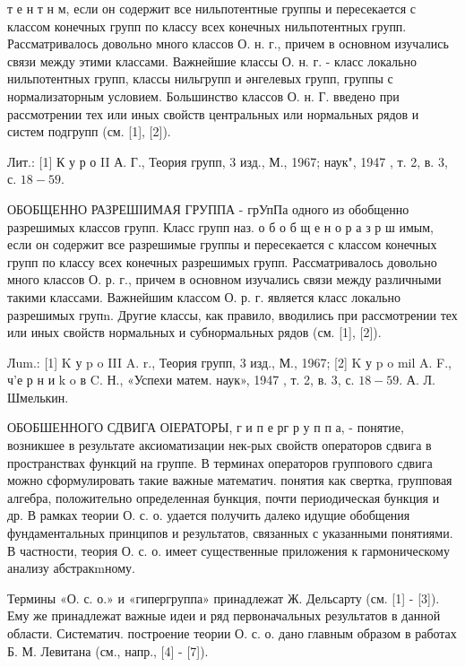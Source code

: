 \documentclass[10pt]{article}
\begin{document}
т е н т н м, если он содержит все нильпотентные группы и пересекается с классом конечных групп по классу всех конечных нильпотентных групп. Рассматривалось довольно много классов О. н. г., причем в основном изучались связи между этими классами. Важнейшие классы О. н. г. - класс локально нильпотентных групп, классы нильгрупп и әнгелевых групп, группы с нормализаторным условием. Большинство классов О. н. Г. введено при рассмотрении тех или иных свойств центральных или нормальных рядов и систем подгрупп (см. [1], [2]).



Лит.: [1] К у р о II А. Г., Теория групп, 3 изд., М., 1967; наук", 1947 , т. 2, в. 3, с. $18-59$.



ОБОБЩЕННО РАЗРЕШІИМАЯ ГРУППА - грУпПа одного из обобщенно разрешимых классов групп. Класс групп наз. о б о б щ е н о р а з р ш имым, если он содержит все разрешимые группы и пересекается с классом конечных групп по классу всех конечных разрешимых групп. Рассматривалось довольно много классов О. р. г., причем в основном изучались связи между различными такими классами. Важнейшим классом О. р. г. является класс локально разрешимых групn. Другие классы, как правило, вводились при рассмотрении тех или иных свойств нормальных и субнормальных рядов (см. [1], [2]).



Лum.: [1] K у p o III A. r., Теория групп, 3 изд., М., 1967; [2] K у p o mil A. F., ч'е р н и k o в C. Н., «Успехи матем. наук», 1947 , т. 2, в. 3, с. $18-59$. А. Л. Шмелькин.



ОБОБШЕННОГО СДВИГА ОІЕРАТОРЫ, $г$ и п е рг р у п п а, - понятие, возникшее в результате аксиоматизации нек-рых свойств операторов сдвига в пространствах функций на группе. В терминах операторов группового сдвига можно сформулировать такие важные математич. понятия как свертка, групповая алгебра, положительно определенная бункция, почти периодическая бункция и др. В рамках теории О. с. о. удается получить далеко идущие обобщения фундаментальных принципов и результатов, связанных с указанными понятиями. В частности, теория О. с. о. имеет существенные приложения к гармоническому анализу абстракmному.



Термины «О. с. о.» и «гипергруппа» принадлежат Ж. Дельсарту (см. [1] - [3]). Ему же принадлежат важные идеи и ряд первоначальных результатов в данной области. Систематич. построение теории О. с. о. дано главным образом в работах Б. М. Левитана (см., напр., [4] - [7]).
\end{document}

